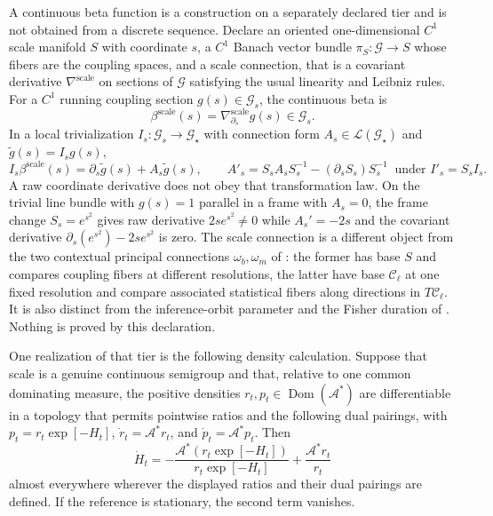 A continuous beta function is a construction on a separately declared tier and
is not obtained from a discrete sequence.  Declare an oriented one-dimensional
$C^1$ scale manifold $S$ with coordinate $s$, a $C^1$ Banach vector bundle
$\pi_S:\mathscr G\to S$ whose fibers are the coupling spaces, and a scale
connection, that is a covariant derivative
$\nabla^{\mathrm{scale}}$ on sections of $\mathscr G$ satisfying the usual
linearity and Leibniz rules.  For a $C^1$ running coupling section
$g(s)\in\mathscr G_s$, the continuous beta is
\begin{equation}
\beta^{\mathrm{scale}}(s)=\nabla^{\mathrm{scale}}_{\partial_s}g(s)
\in\mathscr G_s .
\label{eq:rg-covariant-scale-beta}
\end{equation}
In a local trivialization $I_s:\mathscr G_s\to\mathcal G_\star$ with connection
form $A_s\in\mathcal L(\mathcal G_\star)$ and $\widetilde g(s)=I_sg(s)$,
\begin{equation}
I_s\beta^{\mathrm{scale}}(s)
=\partial_s\widetilde g(s)+A_s\widetilde g(s),
\qquad
A'_s=S_sA_sS_s^{-1}-(\partial_sS_s)S_s^{-1}
\ \text{ under }I'_s=S_sI_s .
\label{eq:rg-scale-connection-form}
\end{equation}
A raw coordinate derivative does not obey that transformation law.  On the
trivial line bundle with $g(s)=1$ parallel in a frame with $A_s=0$, the frame
change $S_s=e^{s^2}$ gives raw derivative $2se^{s^2}\neq0$ while
$A_s'=-2s$ and the covariant derivative
$\partial_s(e^{s^2})-2se^{s^2}$ is zero.
The scale connection is a different object from the two contextual principal
connections $\omega_b,\omega_m$ of : the former has
base $S$ and compares coupling fibers at different resolutions, the latter have
base $\mathcal C_\ell$ at one fixed resolution and compare associated
statistical fibers along directions in $T\mathcal C_\ell$.  It is also distinct
from the inference-orbit parameter and the Fisher duration of
.  Nothing is proved by this declaration.

One realization of that tier is the following density calculation.
Suppose that scale is a genuine continuous semigroup and that, relative
to one common dominating measure, the positive densities
$r_t,p_t\in\operatorname{Dom}(\mathcal A^*)$ are differentiable in a topology
that permits pointwise ratios and the following dual pairings, with
$p_t=r_t\exp[-H_t]$, $\dot r_t=\mathcal A^*r_t$, and
$\dot p_t=\mathcal A^*p_t$.  Then
\begin{equation}
\boxed{
\dot H_t
=-\frac{\mathcal A^*(r_t\exp[-H_t])}
{r_t\exp[-H_t]}
+\frac{\mathcal A^*r_t}{r_t}}
\label{eq:rg-continuous-beta-functional}
\end{equation}
almost everywhere wherever the displayed ratios and their dual pairings are
defined.  If the reference is stationary, the second term vanishes.

